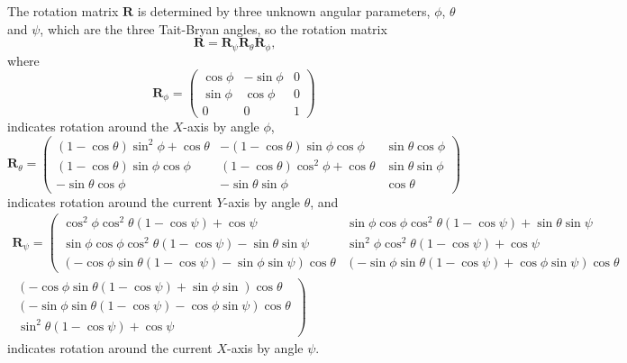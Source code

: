 \documentclass{article}
\renewcommand{\vec}[1]{\mathbf{#1}}
\begin{document}
The rotation matrix $\vec{R}$ is determined by three unknown angular parameters,
$\phi$, $\theta$ and $\psi$, which are the three Tait-Bryan angles,
so the rotation matrix
\begin{equation}
  \vec{R} = \vec{R}_\psi \vec{R}_\theta \vec{R}_\phi\text{,}
\end{equation}
where
\begin{equation}
  \vec{R}_\phi =
  \begin{pmatrix}
    \cos\phi & -\sin\phi & 0 \\
    \sin\phi &  \cos\phi & 0 \\
    0        &  0        & 1
  \end{pmatrix}
\end{equation}
indicates rotation around the $X$-axis by angle $\phi$,
\begin{equation}
  \vec{R}_\theta =
  \begin{pmatrix}
    (1-\cos\theta)\sin^2\phi + \cos\theta & -(1-\cos\theta)\sin\phi\cos\phi         & \sin\theta\cos\phi \\
    (1-\cos\theta)\sin\phi\cos\phi        &  (1-\cos\theta)\cos^2\phi + \cos\theta  & \sin\theta\sin\phi \\
    -\sin\theta\cos\phi                   & -\sin\theta\sin\phi                     & \cos\theta
  \end{pmatrix}
\end{equation}
indicates rotation around the current $Y$-axis by angle $\theta$, and
\begin{equation}
  \begin{split}
    \vec{R}_\psi = \left(\begin{matrix}
       \cos^2\phi\cos^2\theta(1-\cos\psi) + \cos\psi                              &  \sin\phi\cos\phi\cos^2\theta(1-\cos\psi) + \sin\theta\sin\psi \\
       \sin\phi\cos\phi\cos^2\theta (1-\cos\psi)-\sin\theta\sin\psi               &  \sin^2\phi\cos^2\theta(1-\cos\psi) + \cos\psi \\
       \left(-\cos\phi\sin\theta(1-\cos\psi) - \sin\phi\sin\psi\right)\cos\theta  & \left(-\sin\phi\sin\theta(1-\cos\psi) + \cos\phi\sin\psi\right)\cos\theta
    \end{matrix}\right. \\
    \left.\begin{matrix}
      \left(-\cos\phi\sin\theta(1-\cos\psi) + \sin\phi\sin\right)\cos\theta\\
      \left(-\sin\phi\sin\theta(1-\cos\psi) - \cos\phi\sin\psi\right)\cos\theta\\
       \sin^2\theta(1-\cos\psi) + \cos\psi
    \end{matrix}\right)
  \end{split}
\end{equation}
indicates rotation around the current $X$-axis by angle $\psi$.
\end{document}
